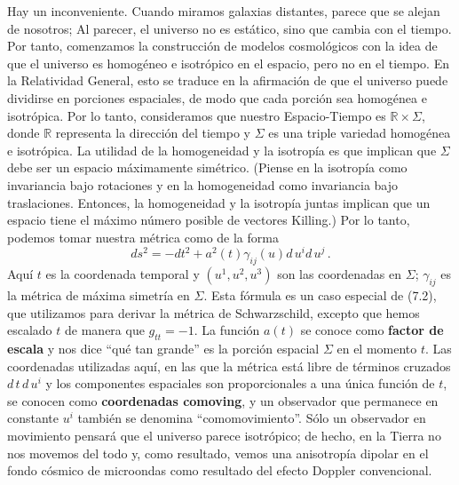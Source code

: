 \documentclass[11pt,b5paper,openany,twoside]{book}
\newcommand{\R}{\mathbb{R}}
\begin{document}
Hay un inconveniente.
Cuando miramos galaxias distantes, parece que se alejan de nosotros; Al parecer, el universo no es estático, sino que cambia con el tiempo.
Por tanto, comenzamos la construcción de modelos cosmológicos con la idea de que el universo es homogéneo e isotrópico en el espacio, pero no en el tiempo.
En la Relatividad General, esto se traduce en la afirmación de que el universo puede dividirse en porciones espaciales, de modo que cada porción sea homogénea e isotrópica.
Por lo tanto, consideramos que nuestro Espacio-Tiempo es $\R\times\Sigma$, donde $\R$ representa la dirección del tiempo y $\Sigma$ es una triple variedad homogénea e isotrópica.
La utilidad de la homogeneidad y la isotropía es que implican que $\Sigma$ debe ser un espacio máximamente simétrico.
(Piense en la isotropía como invariancia bajo rotaciones y en la homogeneidad como invariancia bajo traslaciones.
Entonces, la homogeneidad y la isotropía juntas implican que un espacio tiene el máximo número posible de vectores Killing.)
Por lo tanto, podemos tomar nuestra métrica como de la forma
\begin{equation}
ds^2 = -dt^2 + a^2(t)\gamma_{ij}(u) d\,u^i d\,u^j\,.\label{8.1}
\end{equation}
Aquí $t$ es la coordenada temporal y $(u^1, u^2, u^3)$ son las coordenadas en $\Sigma$; $\gamma_{ij}$ es la métrica de máxima simetría en $\Sigma$.
Esta fórmula es un caso especial de (7.2), que utilizamos para derivar la métrica de Schwarzschild, excepto que hemos escalado $t$ de manera que $g_{tt}=-1$.
La función $a(t)$ se conoce como {\bf factor de escala} y nos dice ``qué tan grande'' es la porción espacial $\Sigma$ en el momento $t$.
Las coordenadas utilizadas aquí, en las que la métrica está libre de términos cruzados $ d\,t\, d\,u^i$ y los componentes espaciales son proporcionales a una única función de $t$, se conocen como {\bf coordenadas comoving}, y un observador que permanece en constante $u^i$ también se denomina ``comomovimiento''.
Sólo un observador en movimiento pensará que el universo parece isotrópico; de hecho, en la Tierra no nos movemos del todo y, como resultado, vemos una anisotropía dipolar en el fondo cósmico de microondas como resultado del efecto Doppler convencional.
\end{document}
